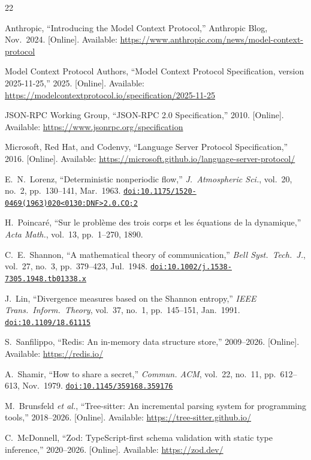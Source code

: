 \documentclass[journal,10pt]{IEEEtran}
\newcommand{\doi}[1]{\href{https://doi.org/#1}{\texttt{doi:#1}}}
\begin{document}
\begin{thebibliography}{22}

Anthropic, ``Introducing the Model Context Protocol,'' Anthropic Blog, Nov.\ 2024. [Online]. Available: \url{https://www.anthropic.com/news/model-context-protocol}

Model Context Protocol Authors, ``Model Context Protocol Specification, version 2025-11-25,'' 2025. [Online]. Available: \url{https://modelcontextprotocol.io/specification/2025-11-25}

JSON-RPC Working Group, ``JSON-RPC 2.0 Specification,'' 2010. [Online]. Available: \url{https://www.jsonrpc.org/specification}

Microsoft, Red Hat, and Codenvy, ``Language Server Protocol Specification,'' 2016. [Online]. Available: \url{https://microsoft.github.io/language-server-protocol/}

E.~N.~Lorenz, ``Deterministic nonperiodic flow,'' \emph{J.\ Atmospheric Sci.}, vol.~20, no.~2, pp.~130--141, Mar.\ 1963. \doi{10.1175/1520-0469(1963)020<0130:DNF>2.0.CO;2}

H.~Poincar\'{e}, ``Sur le probl\`{e}me des trois corps et les \'{e}quations de la dynamique,'' \emph{Acta Math.}, vol.~13, pp.~1--270, 1890.

C.~E.~Shannon, ``A mathematical theory of communication,'' \emph{Bell Syst.\ Tech.\ J.}, vol.~27, no.~3, pp.~379--423, Jul.\ 1948. \doi{10.1002/j.1538-7305.1948.tb01338.x}

J.~Lin, ``Divergence measures based on the Shannon entropy,'' \emph{IEEE Trans.\ Inform.\ Theory}, vol.~37, no.~1, pp.~145--151, Jan.\ 1991. \doi{10.1109/18.61115}

S.~Sanfilippo, ``Redis: An in-memory data structure store,'' 2009--2026. [Online]. Available: \url{https://redis.io/}

A.~Shamir, ``How to share a secret,'' \emph{Commun. ACM}, vol.~22, no.~11, pp.~612--613, Nov.\ 1979. \doi{10.1145/359168.359176}

M.~Brunsfeld \emph{et al.}, ``Tree-sitter: An incremental parsing system for programming tools,'' 2018--2026. [Online]. Available: \url{https://tree-sitter.github.io/}

C.~McDonnell, ``Zod: TypeScript-first schema validation with static type inference,'' 2020--2026. [Online]. Available: \url{https://zod.dev/}


\end{thebibliography}
\end{document}
